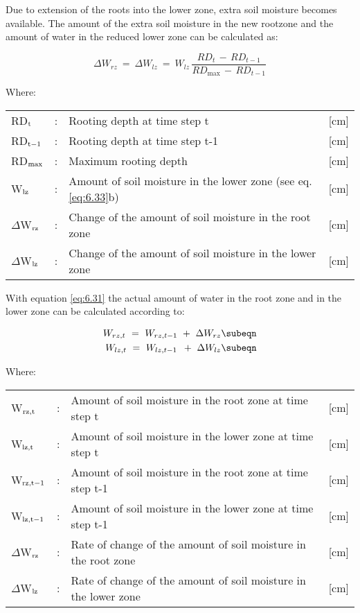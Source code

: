 Due to extension of the roots into the lower zone, extra soil moisture becomes available.
The amount of the extra soil moisture in the new rootzone and the amount of water in the
reduced lower zone can be calculated as:

\begin{equation}
\label{eq:6.32}
\Delta W _{rz} ~=~\Delta W _{lz} ~=~ W _{lz} \,{\frac{ RD _{t} \, -\, RD _{t-1} }{RD _{\max } \, -\, RD _{t-1} }}
\end{equation}

Where:\\[5pt]
\begin{tabularx}{\textwidth}{llXr}
RD$_{{\rm t}}$ &:& Rooting depth at time step t  & [cm]\\
RD$_{{\rm t-1}}$ &:& Rooting depth at time step t-1  & [cm]\\
RD$_{{\rm max}}$ &:& Maximum rooting depth  & [cm]\\
W$_{{\rm lz}}$ &:& Amount of soil moisture in the lower zone (see eq. \ref{eq:6.33}b)  & [cm]\\
$\Delta$W$_{{\rm rz}}$ &:& Change of the amount of soil moisture in the root zone  & [cm]\\
$\Delta$W$_{{\rm lz}}$ &:& Change of the amount of soil moisture in the lower zone  & [cm]\\
\end{tabularx}

With equation \ref{eq:6.31} the actual amount of water in the root zone and in the lower zone can
be calculated according to:

\begin{align}
\label{eq:6.33}
W _{rz,t} ~=~ W _{rz, t-1} ~+~ \Delta W _{rz} \subeqn  \\
W _{lz,t} ~=~ W _{lz, t-1} ~\, +~ \Delta W _{lz} \subeqn
\end{align}

Where:\\[5pt]
\begin{tabularx}{\textwidth}{llXr}
W$_{{\rm rz,t}}$ &:& Amount of soil moisture in the root zone at time step t  & [cm]\\
W$_{{\rm lz,t}}$ &:& Amount of soil moisture in the lower zone at time step t  & [cm]\\
W$_{{\rm rz,t-1}}$ &:& Amount of soil moisture in the root zone at time step t-1  & [cm]\\
W$_{{\rm lz,t-1}}$ &:& Amount of soil moisture in the lower zone at time step t-1  & [cm]\\
$\Delta$W$_{{\rm rz}}$ &:& Rate of change of the amount of soil moisture in the root 
   zone  & [cm]\\
$\Delta$W$_{{\rm lz}}$ &:& Rate of change of the amount of soil moisture in the 
   lower zone  & [cm]\\
\end{tabularx}

